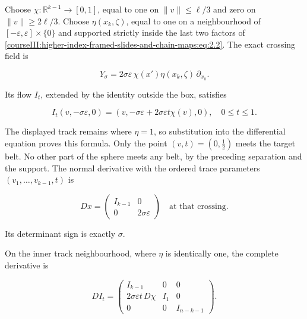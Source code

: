 Choose \(\chi:\mathbb R^{k-1}\to[0,1]\), equal to one on \(\|v\|\leq\ell/3\) and zero on \(\|v\|\geq2\ell/3\). Choose \(\eta(x_k,\zeta)\), equal to one on a neighbourhood of \([-\varepsilon,\varepsilon]\times\{0\}\) and supported strictly inside the last two factors of \eqref{courseIII:higher-index-framed-slides-and-chain-maps:eq:2.2}. The exact crossing field is

\begin{equation}
Y_\sigma
   =2\sigma\varepsilon\,\chi(x')\eta(x_k,\zeta)\,\partial_{x_k}.
 \label{courseIII:higher-index-framed-slides-and-chain-maps:eq:2.5}
\end{equation}

Its flow \(I_t\), extended by the identity outside the box, satisfies

\begin{equation}
I_t(v,-\sigma\varepsilon,0)
  =(v,-\sigma\varepsilon+2\sigma\varepsilon t\chi(v),0),
 \quad 0\leq t\leq1.
 \label{courseIII:higher-index-framed-slides-and-chain-maps:eq:2.6}
\end{equation}

The displayed track remains where \(\eta=1\), so substitution into the differential equation proves this formula. Only the point \((v,t)=(0,\tfrac12)\) meets the target belt. No other part of the sphere meets any belt, by the preceding separation and the support. The normal derivative with the ordered trace parameters \((v_1,\ldots,v_{k-1},t)\) is

\begin{equation}
D x=
 \begin{pmatrix}I_{k-1}&0\\0&2\sigma\varepsilon\end{pmatrix}
 \quad\text{at that crossing}.
 \label{courseIII:higher-index-framed-slides-and-chain-maps:eq:2.7}
\end{equation}

Its determinant sign is exactly \(\sigma\).

On the inner track neighbourhood, where \(\eta\) is identically one, the complete derivative is

\begin{equation}
D I_t=
 \begin{pmatrix}
 I_{k-1}&0&0\\
 2\sigma\varepsilon t\,D\chi&I_1&0\\
 0&0&I_{n-k-1}
 \end{pmatrix}.
 \label{courseIII:higher-index-framed-slides-and-chain-maps:eq:2.8}
\end{equation}

